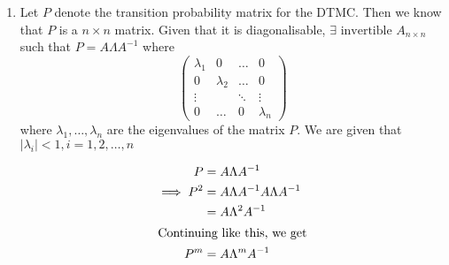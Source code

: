\documentclass[12pt, oneside]{article}
\begin{document}
\begin{enumerate}
{\begin{enumerate}
{            This tells us that the given DTMC will not have a stationary distribution.
        }
        \item {
            Let \(P\) denote the transition probability matrix for the DTMC. Then we know
            that \(P\) is a \(n \times n\) matrix. Given that it is diagonalisable,
            \(\exists \text{ invertible } A_{n \times n}\) such that \(P = A \Lambda A^{-1}\)
            where
            \[\begin{pmatrix}
                \lambda_1 & 0         & \dots  & 0 \\
                0         & \lambda_2 & \dots  & 0 \\
                \vdots    &           & \ddots & \vdots\\
                0         & \dots     & 0      & \lambda_n 
            \end{pmatrix}\]
            where \(\lambda_1, \ldots, \lambda_n\) are the eigenvalues of the matrix \(P\).
            We are given that \(|\lambda_i| < 1, i = 1, 2, \ldots, n  \)
            
            \begin{align*}
                P &= A \Lambda A^{-1} \\
                \implies P^2 &= A \Lambda A^{-1} A \Lambda A^{-1} \\
                             &= A \Lambda ^ 2 A^{-1} \\
                \intertext{Continuing like this, we get}
                P^m &= A \Lambda ^ m A^{-1} \\
            \end{align*}

}
\end{enumerate}}
\end{enumerate}
\end{document}
